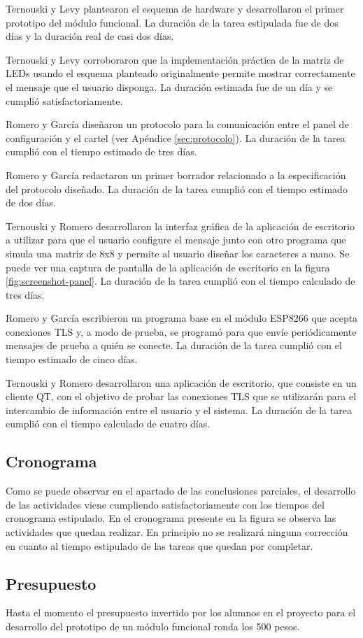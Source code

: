 Ternouski y Levy plantearon el esquema de hardware y desarrollaron el primer prototipo del módulo funcional. La duración de la tarea estipulada fue de dos días y la duración real de casi dos días.

Ternouski y Levy corroboraron que la implementación práctica de la matriz de LEDs usando el esquema planteado originalmente permite mostrar correctamente el mensaje que el usuario disponga. La duración estimada fue de un día y se cumplió satisfactoriamente.

Romero y García diseñaron un protocolo para la comunicación entre el panel de configuración y el cartel (ver Apéndice \ref{sec:protocolo}). La duración de la tarea cumplió con el tiempo estimado de tres días.

Romero y García redactaron un primer borrador relacionado a la especificación del protocolo diseñado. La duración de la tarea cumplió con el tiempo estimado de dos días.

Ternouski y Romero desarrollaron la interfaz gráfica de la aplicación de escritorio a utilizar para que el usuario configure el mensaje junto con otro programa que simula una matriz de 8x8 y permite al usuario diseñar los caracteres a mano. Se puede ver una captura de pantalla de la aplicación de escritorio en la figura \ref{fig:screenshot-panel}. La duración de la tarea cumplió con el tiempo calculado de tres días.

Romero y García escribieron un programa base en el módulo ESP8266 que acepta conexiones TLS y, a modo de prueba, se programó para que envíe periódicamente mensajes de prueba a quién se conecte. La duración de la tarea cumplió con el tiempo estimado de cinco días.

Ternouski y Romero desarrollaron una aplicación de escritorio, que consiste en un cliente QT, con el objetivo de probar las conexiones TLS que se utilizarán para el intercambio de información entre el usuario y el sistema. La duración de la tarea cumplió con el tiempo calculado de cuatro días.

\subsection{Cronograma}
Como se puede observar en el apartado de las conclusiones parciales, el desarrollo de las actividades viene cumpliendo satisfactoriamente con los tiempos del cronograma estipulado. En el cronograma presente en la figura se observa las actividades que quedan realizar. En principio no se realizará ninguna corrección en cuanto al tiempo estipulado de las tareas que quedan por completar.



\subsection{Presupuesto}
Hasta el momento el presupuesto invertido por los alumnos en el proyecto para el desarrollo del prototipo de un módulo funcional ronda los 500 pesos.